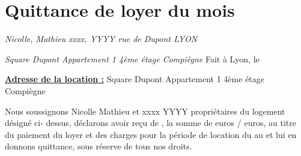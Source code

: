 \documentclass[a4paper,12pt]{article}
\begin{document}

\section*{\centering \LARGE Quittance de loyer du mois }

\begin{flushleft} 
\textit{\linebreak Nicolle, Mathieu \linebreak
xxxx, YYYY  rue de Dupont  LYON}
\end{flushleft}

\begin{flushright}
\textit{
  Square Dupont \linebreak
Appartement 1 4ème étage  Compiègne} \linebreak
\linebreak
Fait à Lyon, le 
\end{flushright}

\begin{flushleft} 
\underline{\textbf{Adresse de la location :}} Square Dupont \linebreak
Appartement 1 4ème étage  Compiègne
\end{flushleft}

Nous soussignons Nicolle Mathieu et xxxx YYYY propriétaires du logement désigné ci- dessus, déclarons avoir reçu de , la somme de  euros /  euros, au titre du paiement du loyer et des charges pour la période de location du  au  et lui en donnons quittance, sous réserve de tous nos droits.
\end{document}
